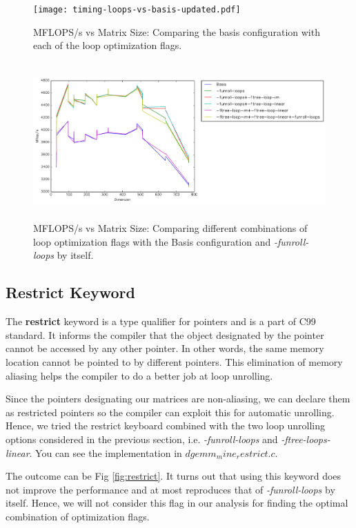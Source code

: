 \documentclass{article}
\begin{document}
  \begin{figure}[h]
    \centering
    \texttt{[image: timing-loops-vs-basis-updated.pdf]}
    \caption{MFLOPS/s vs Matrix Size: Comparing the basis configuration with each of the loop optimization flags.}
    \label{fig:timing-loops1}
  \end{figure}
  
    \begin{figure}[h]
    \centering
    \includegraphics[width=14cm,height=6cm]{timing-loopunroll-vs-combos.pdf}
    \caption{MFLOPS/s vs Matrix Size: Comparing different combinations of loop optimization flags with the Basis configuration and \textit{-funroll-loops} by itself.}
    \label{fig:timing-loops2}
  \end{figure}


\subsection{Restrict Keyword}

The {\bf restrict} keyword is a type qualifier for pointers and is a part of C99 standard. It informs the compiler that the object designated by the pointer cannot be accessed by any other pointer. In other words, the same memory location cannot be pointed to by different pointers. This elimination of memory aliasing helps the compiler to do a better job at loop unrolling.

Since the pointers designating our matrices are non-aliasing, we can declare them as restricted pointers so the compiler can exploit this for automatic unrolling. 
Hence, we tried the restrict keyboard combined with the two loop unrolling options considered in the previous section, i.e. \textit{-funroll-loops} and \textit{-ftree-loops-linear}. You can see the implementation in $dgemm_mine_restrict.c$.

The outcome can be Fig \ref{fig:restrict}. It turns out that using this keyword does not improve the performance and at most reproduces that of \textit{-funroll-loops} by itself. Hence, we will not consider this flag in our analysis for finding the optimal combination of optimization flags.
\end{document}
